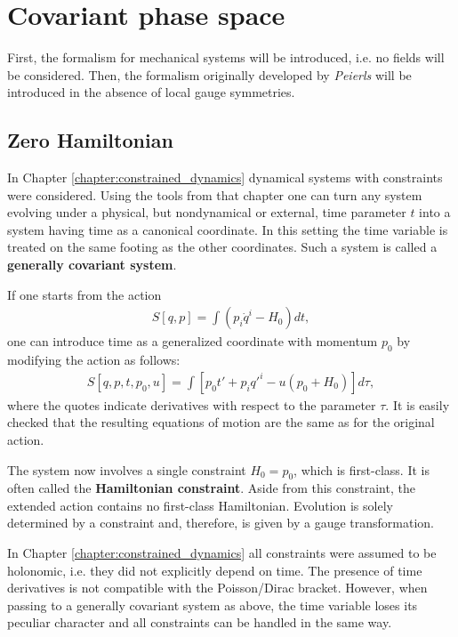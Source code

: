\section{Covariant phase space}

    First, the formalism for mechanical systems will be introduced, i.e. no fields will be considered. Then, the formalism originally developed by \textit{Peierls} will be introduced in the absence of local gauge symmetries.

\subsection{Zero Hamiltonian}

    In Chapter \ref{chapter:constrained_dynamics} dynamical systems with constraints were considered. Using the tools from that chapter one can turn any system evolving under a physical, but nondynamical or external, time parameter $t$ into a system having time as a canonical coordinate. In this setting the time variable is treated on the same footing as the other coordinates. Such a system is called a \textbf{generally covariant system}.

    If one starts from the action
    \begin{gather}
        S[q,p] = \int\left(p_i\dot{q}^i-H_0\right)dt,
    \end{gather}
    one can introduce time as a generalized coordinate with momentum $p_0$ by modifying the action as follows:
    \begin{gather}
        S[q,p,t,p_0,u] = \int\left[p_0t'+p_iq'^i-u(p_0+H_0)\right]d\tau,
    \end{gather}
    where the quotes indicate derivatives with respect to the parameter $\tau$. It is easily checked that the resulting equations of motion are the same as for the original action.

    The system now involves a single constraint $H_0=p_0$, which is first-class. It is often called the \textbf{Hamiltonian constraint}. Aside from this constraint, the extended action contains no first-class Hamiltonian. Evolution is solely determined by a constraint and, therefore, is given by a gauge transformation.

    \begin{remark}
        In Chapter \ref{chapter:constrained_dynamics} all constraints were assumed to be holonomic, i.e. they did not explicitly depend on time. The presence of time derivatives is not compatible with the Poisson/Dirac bracket. However, when passing to a generally covariant system as above, the time variable loses its peculiar character and all constraints can be handled in the same way.
    \end{remark}

